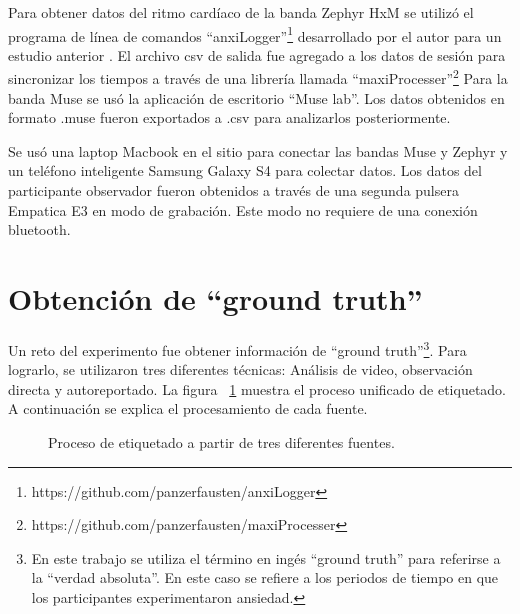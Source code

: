 Para obtener datos del ritmo card\'iaco de la banda Zephyr HxM se utiliz\'o el programa de l\'inea de comandos ``anxiLogger''\footnote{https://github.com/panzerfausten/anxiLogger} desarrollado por el autor para un estudio anterior \citep{Miranda}. El archivo csv de salida fue agregado a los datos de sesi\'on para sincronizar los tiempos a trav\'es de una librer\'ia llamada ``maxiProcesser''\footnote{https://github.com/panzerfausten/maxiProcesser}
	Para la banda Muse se us\'o la aplicaci\'on de escritorio ``Muse lab''. Los datos obtenidos en formato .muse fueron exportados a .csv para analizarlos posteriormente.

	Se us\'o una laptop Macbook en el sitio para conectar las bandas Muse y Zephyr y un tel\'efono inteligente Samsung Galaxy S4 para colectar datos. Los datos del participante observador fueron obtenidos a trav\'es de una segunda pulsera Empatica E3 en modo de grabaci\'on. Este modo no requiere de una conexi\'on bluetooth.


\section{Obtenci\'on de ``ground truth''}\label{secc:dataanalysis}
Un reto del experimento fue obtener informaci\'on de ``ground truth''\footnote{En este trabajo se utiliza el t\'ermino en ing\'es ``ground truth'' para referirse a la ``verdad absoluta''. En este caso se refiere a los periodos de tiempo en que los participantes experimentaron ansiedad.}. Para lograrlo, se utilizaron tres diferentes t\'ecnicas: An\'alisis de video, observaci\'on directa y autoreportado. La figura ~\ref{fig:labeling} muestra el proceso unificado de etiquetado. A continuaci\'on se explica el procesamiento de cada fuente.

\begin{figure}[h]
        \centering
	\caption{Proceso de etiquetado a partir de tres diferentes fuentes.}\label{fig:labeling}
\end{figure}
